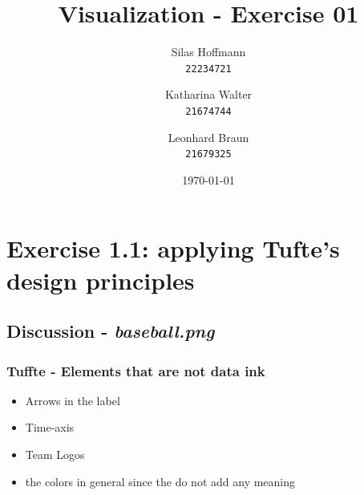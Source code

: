 \documentclass[a4paper]{article}
\title{Visualization - Exercise 01}
\author{
    Silas Hoffmann \\
    \texttt{22234721}
    \and
    Katharina Walter \\
    \texttt{21674744}
    \and
    Leonhard Braun \\
    \texttt{21679325}
}
\date{\today}
\begin{document}
    \maketitle


    \section{Exercise 1.1: applying Tufte's design principles}

    \subsection{Discussion - \textit{baseball.png}}

    \subsubsection{Tuffte - Elements that are not \textbf{data ink}}
    \begin{itemize}
        \item Arrows in the label
        \item Time-axis
        \item Team Logos
        \item the colors in general since the do not add any meaning
    \end{itemize}
\end{document}
